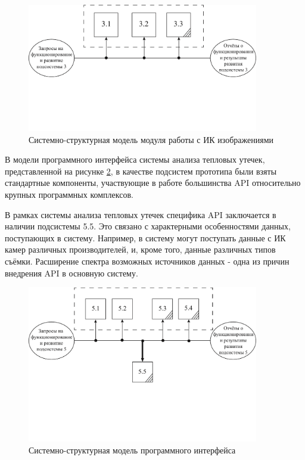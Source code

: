 	\begin{figure}[t!]
      \centering
      \includegraphics[width=0.9\textwidth]{images/ssm/3}
      \caption{Системно-структурная модель модуля работы с ИК изображениями}
      \label{ssm:3}
    \end{figure}

\par
	В модели программного интерфейса системы анализа тепловых утечек, представленной на рисунке \ref{ssm:5}, в качестве подсистем прототипа были взяты стандартные компоненты, участвующие в работе большинства API относительно крупных программных комплексов. 
	
	В рамках системы анализа тепловых утечек специфика API заключается в наличии подсистемы 5.5. Это связано с характерными особенностями данных, поступающих в систему. Например, в систему могут поступать данные с ИК камер различных производителей, и, кроме того, данные различных типов съёмки. Расширение спектра возможных источников данных - одна из причин внедрения API в основную систему.

\pagebreak

	\begin{figure}[t!]
      \centering
      \includegraphics[width=0.9\textwidth]{images/ssm/5}
      \caption{Системно-структурная модель программного интерфейса}
      \label{ssm:5}
    \end{figure}

